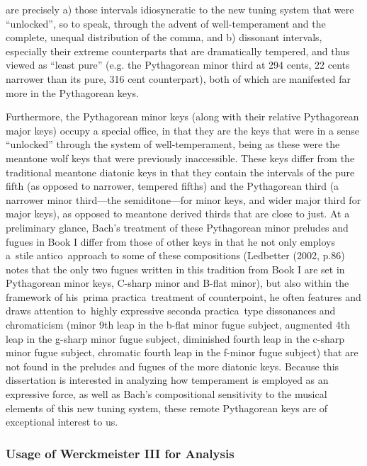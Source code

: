 are precisely a) those intervals idiosyncratic to the new tuning system
that were ``unlocked'', so to speak, through the advent of
well-temperament and the complete, unequal distribution of the comma,
and b) dissonant intervals, especially their extreme counterparts that
are dramatically tempered, and thus viewed as ``least pure'' (e.g. the
Pythagorean minor third at 294 cents, 22 cents narrower than its pure,
316 cent counterpart), both of which are manifested far more in the
Pythagorean keys.

Furthermore, the Pythagorean minor keys (along with their relative
Pythagorean major keys) occupy a special office, in that they are the
keys that were in a sense ``unlocked'' through the system of
well-temperament, being as these were the meantone wolf keys that were
previously inaccessible. These keys differ from the traditional meantone
diatonic keys in that they contain the intervals of the pure fifth (as
opposed to narrower, tempered fifths) and the Pythagorean third (a
narrower minor third---the semiditone---for minor keys, and wider major
third for major keys), as opposed to meantone derived thirds that are
close to just. At a preliminary glance, Bach's treatment of these
Pythagorean minor preludes and fugues in Book I differ from those of
other keys in that he not only employs a~stile antico~approach to some
of these compositions (Ledbetter (2002, p.86) notes that the only two
fugues written in this tradition from Book I are set in Pythagorean
minor keys, C-sharp minor and B-flat minor), but also within the
framework of his~prima practica~treatment of counterpoint, he often
features and draws attention to~highly expressive seconda practica~type
dissonances and chromaticism (minor 9th leap in the b-flat minor fugue
subject, augmented 4th leap in the g-sharp minor fugue subject,
diminished fourth leap in the c-sharp minor fugue subject, chromatic
fourth leap in the f-minor fugue subject) that are not found in the
preludes and fugues of the more diatonic keys. Because this dissertation
is interested in analyzing how temperament is employed as an expressive
force, as well as Bach's compositional sensitivity to the musical
elements of this new tuning system, these remote Pythagorean keys are of
exceptional interest to us.

\subsubsection{Usage of Werckmeister III for
Analysis}\label{usage-of-werckmeister-iii-for-analysis}

